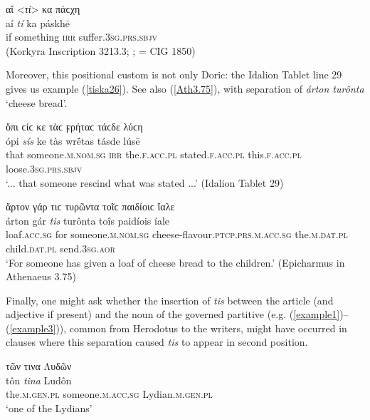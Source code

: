 \begin{exe}
\ex αἴ \textless{}\emph{τί}\textgreater{} κα πάϲχη\\
\gll aí \emph{tí} ka páskhē\\
if something \textsc{irr} suffer.\textsc{3sg.prs.sbjv}\\
\trans(Korkyra Inscription 3213.3; \citealp[100]{Blass1888}; = CIG 1850)
\label{tiska25}
\end{exe}

Moreover, this positional custom is not only Doric: the Idalion Tablet line 29 gives us example (\ref{tiska26}). See also (\ref{Ath3.75}), with separation of \textit{árton turônta} `cheese bread'.

\begin{exe}
\ex ὄπι ϲίϲ κε τὰϲ ϝρήταϲ τάϲδε λύϲη\\
\gll ópi \emph{sís} ke tàs wrḗtas tásde lúsē\\
that someone.\textsc{m.nom.sg} \textsc{irr} the.\textsc{f.acc.pl}
stated.\textsc{f.acc.pl} this.\textsc{f.acc.pl} loose.\textsc{3sg.prs.sbjv}\\
\trans `... that someone rescind what was stated ...' (Idalion Tablet 29)
\label{tiska26}
\end{exe}

\begin{exe}
\ex ἄρτον γάρ τιϲ τυρῶντα τοῖϲ παιδίοιϲ ἴαλε\\
\gll árton gár \emph{tis} turônta toîs paidíois íale\\
loaf.\textsc{acc.sg} for someone.\textsc{m.nom.sg} cheese-flavour.\textsc{ptcp.prs.m.acc.sg} the.\textsc{m.dat.pl} child.\textsc{dat.pl} send.\textsc{3sg.aor}\\
\trans `For someone has given a loaf of cheese bread to the children.' (Epicharmus in Athenaeus 3.75)
\label{Ath3.75}
\end{exe}

Finally, one might ask whether the insertion of \textit{tis} between the article (and adjective if present) and the noun of the governed partitive  (e.g. (\ref{example1})--(\ref{example3})), common from Herodotus to the  writers, might have occurred in clauses where this separation caused \textit{tis} to appear in second position.

\begin{exe}
\ex τῶν τινα Λυδῶν\\
\gll tôn \emph{tina} Ludôn\\
the.\textsc{m.gen.pl} someone.\textsc{m.acc.sg} Lydian.\textsc{m.gen.pl}\\
\trans `one of the Lydians'
\label{example1}
\end{exe}


